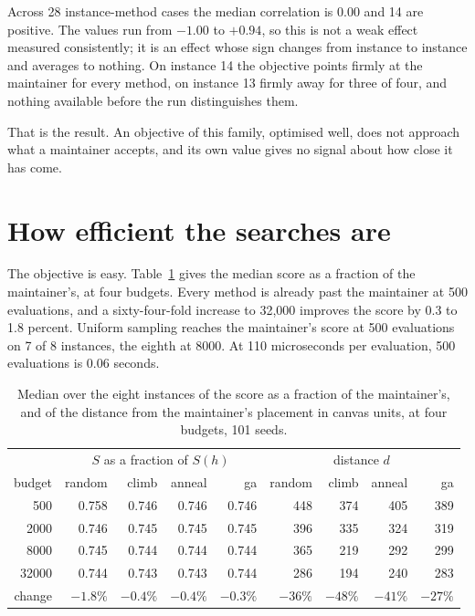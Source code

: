 \documentclass[11pt]{article}
\begin{document}
Across 28 instance-method cases the median correlation is $0.00$ and 14 are positive. The values
run from $-1.00$ to $+0.94$, so this is not a weak effect measured consistently; it is an effect
whose sign changes from instance to instance and averages to nothing. On instance 14 the
objective points firmly at the maintainer for every method, on instance 13 firmly away for three
of four, and nothing available before the run distinguishes them.

That is the result. An objective of this family, optimised well, does not approach what a
maintainer accepts, and its own value gives no signal about how close it has come.


\section{How efficient the searches are}\label{sec:eff}

The objective is easy. Table~\ref{tab:eff} gives the median score as a fraction of the
maintainer's, at four budgets. Every method is already past the maintainer at 500 evaluations,
and a sixty-four-fold increase to 32{,}000 improves the score by 0.3 to 1.8 percent. Uniform
sampling reaches the maintainer's score at 500 evaluations on 7 of 8 instances, the eighth at
8000. At 110 microseconds per evaluation, 500 evaluations is 0.06 seconds.

\begin{table}[h]
\centering
\caption{Median over the eight instances of the score as a fraction of the maintainer's, and of
the distance from the maintainer's placement in canvas units, at four budgets, 101 seeds.}
\label{tab:eff}
\begin{tabular}{r|rrrr|rrrr}
\toprule
& \multicolumn{4}{c|}{$S$ as a fraction of $S(h)$} & \multicolumn{4}{c}{distance $d$} \\
budget & random & climb & anneal & ga & random & climb & anneal & ga \\
\midrule
   500 & 0.758 & 0.746 & 0.746 & 0.746 & 448 & 374 & 405 & 389 \\
  2000 & 0.746 & 0.745 & 0.745 & 0.745 & 396 & 335 & 324 & 319 \\
  8000 & 0.745 & 0.744 & 0.744 & 0.744 & 365 & 219 & 292 & 299 \\
 32000 & 0.744 & 0.743 & 0.743 & 0.744 & 286 & 194 & 240 & 283 \\
\midrule
change & $-1.8\%$ & $-0.4\%$ & $-0.4\%$ & $-0.3\%$ & $-36\%$ & $-48\%$ & $-41\%$ & $-27\%$ \\
\bottomrule
\end{tabular}
\end{table}
\end{document}
